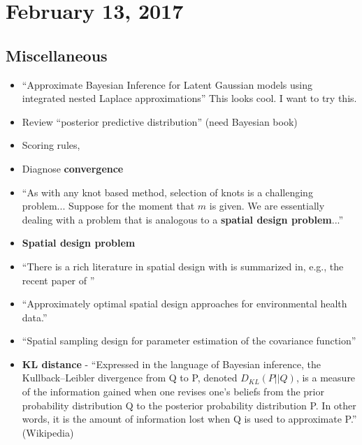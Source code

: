 \documentclass{article}
\begin{document}
\section*{February 13, 2017}

\subsection*{Miscellaneous}
\begin{itemize}
\item ``Approximate Bayesian Inference for Latent Gaussian models using integrated nested Laplace approximations'' \citep{Rue2009} This looks cool. I want to try this.
\item Review ``posterior predictive distribution'' (need Bayesian book)
\item Scoring rules, \citep{Bickel2007}
\item Diagnose {\bf convergence}
\item ``As with any knot based method, selection of knots is a challenging problem... Suppose for the moment that $m$ is given. We are essentially dealing with a problem that is analogous to a {\bf spatial design problem}...'' \citep{Finley2009}
\item {\bf Spatial design problem}
\item ``There is a rich literature in spatial design with is summarized in, e.g., the recent paper of \cite{Xia2006}''
\item ``Approximately optimal spatial design approaches for environmental health data.'' \citep{Xia2006}
\item ``Spatial sampling design for parameter estimation of the covariance function'' \citep{Zhu2005}
\item {\bf KL distance} - ``Expressed in the language of Bayesian inference, the Kullback–Leibler divergence from Q to P, denoted $D_{KL}(P||Q)$, is a measure of the information gained when one revises one's beliefs from the prior probability distribution Q to the posterior probability distribution P. In other words, it is the amount of information lost when Q is used to approximate P.'' (Wikipedia)
\end{itemize}

\end{document}
